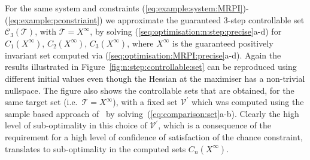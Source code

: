 \documentclass{ifacconf}
\providecommand{\norm}[1]{\left\|#1\right\|}
\providecommand{\C}{\mathscr C}
\providecommand{\V}{\mathcal V}
\providecommand{\T}{\mathcal T}
\begin{document}
%
For the same system and constraints (\ref{eq:example:system:MRPI})-(\ref{eq:example:pconstriaint}) we approximate the guaranteed 3-step controllable set $\C_3(\T)$, with $\T=X^\infty$,
%
by solving (\ref{seq:optimisation:n:step:precise}a-d) for $C_1(X^\infty)$, $C_2(X^\infty)$, $C_3(X^\infty)$, where $X^\infty$ is the guaranteed positively invariant set computed via (\ref{seq:optimisation:MRPI:precise}a-d).
%
Again the results illustrated in Figure~\ref{fig:n:step:controllable:set} can be reproduced using different initial values even though the Hessian at the maximiser has a non-trivial nullspace. 
%
The figure also shows the controllable sets that are obtained, for the same target set (i.e.~$\T=X^\infty$), with a fixed set $\V^\prime$ which was computed using the sample based approach of~\citet{Zhang2015} by solving~(\ref{eq:comparison:set}a-b). 
%
Clearly the high level of sub-optimality in this choice of $\V^\prime$, which is a consequence of the requirement for a high level of confidence of satisfaction of the chance constraint, translates to sub-optimality in the computed sets $C_n(X^\infty)$.
%
\end{document}

